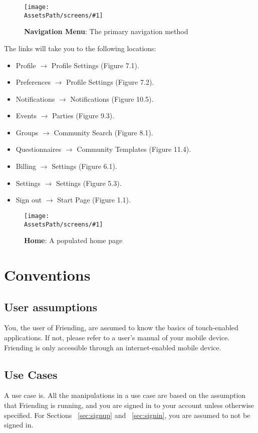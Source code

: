 \documentclass[a4paper,11pt,titlepage]{scrartcl}
\newcommand{\textapp}[1]{{\fontfamily{cmss}\selectfont#1}}
\newcommand{\Friending}{\textapp{Friending}}
\newcommand*{\fileHomepage}{homepage}
\newcommand*{\fileNavigation}{navigation-menu}
\newcommand*{\AssetsPath}{../assets}%
\newcommand{\appscreenshot}[4]{
	\begin{figure}[ht!]%
	\label{#4}%
	\texttt{[image: \\AssetsPath/screens/\#1]}%
	\centering%
	\caption{\textbf{#2}: #3}%
	\end{figure}%
}
\begin{document}
\appscreenshot{\fileNavigation}{Navigation Menu}{The primary navigation method}{fig:navigation}

The links will take you to the following locations:

\begin{itemize}
\item Profile $\rightarrow$ Profile Settings (Figure 7.1).
\item Preferences $\rightarrow$ Profile Settings (Figure 7.2).
\item Notifications $\rightarrow$ Notifications (Figure 10.5).
\item Events $\rightarrow$ Parties (Figure 9.3).
\item Groups $\rightarrow$ Community Search (Figure 8.1).
\item Questionnaires $\rightarrow$ Community Templates (Figure 11.4).
\item Billing $\rightarrow$ Settings (Figure 6.1).
\item Settings $\rightarrow$ Settings (Figure 5.3).
\item Sign out $\rightarrow$ Start Page (Figure 1.1).
\end{itemize}

\appscreenshot{\fileHomepage}{Home}{A populated home page}{fig:home}

\clearpage
\section{Conventions}
\label{sec:conventions}

\subsection{User assumptions}
\label{sec:assumptions}
You, the user of \Friending{}, are assumed to know the basics of touch-enabled applications.  If not, please refer to a user’s manual of your mobile device.  \Friending{} is only accessible through an internet-enabled mobile device.

\subsection{Use Cases}
\label{sec:usecases}
A use case is.  All the manipulations in a use case are based on the assumption that \Friending{} is running, and you are signed in to your account unless otherwise specified.  For Sections ~\ref{sec:signup} and ~\ref{sec:signin}, you are assumed to not be signed in.  
\end{document}
